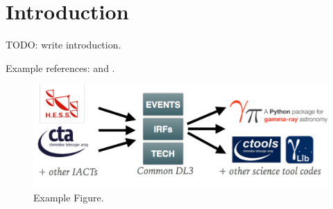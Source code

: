 \section{Introduction}

TODO: write introduction.

Example references: \cite{2015arXiv150907408D} and \citep{2016arXiv160600393K}.

\begin{figure}[tb]
  \centerline{\includegraphics[width=\textwidth]{figures/fig1.pdf}}
  \caption{Example Figure.}
\end{figure}

% 
